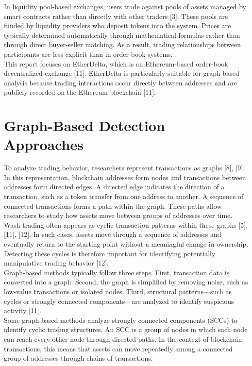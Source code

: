\documentclass[language=english,thesis=bachelor,nosecondtitle,onesided,faculty=cb]{hsmw-thesis}
\begin{document}
In liquidity pool-based exchanges, users trade against pools of assets managed by smart contracts rather than directly with other traders [3]. These pools are funded by liquidity providers who deposit tokens into the system. Prices are typically determined automatically through mathematical formulas rather than through direct buyer-seller matching. As a result, trading relationships between participants are less explicit than in order-book systems.\\
This report focuses on EtherDelta, which is an Ethereum-based order-book decentralized exchange [11]. EtherDelta is particularly suitable for graph-based analysis because trading interactions occur directly between addresses and are publicly recorded on the Ethereum blockchain [11].

	\section{Graph-Based Detection Approaches}
To analyze trading behavior, researchers represent transactions as graphs [8], [9]. In this representation, blockchain addresses form nodes and transactions between addresses form directed edges. A directed edge indicates the direction of a transaction, such as a token transfer from one address to another. A sequence of connected transactions forms a path within the graph. These paths allow researchers to study how assets move between groups of addresses over time.\\
Wash trading often appears as cyclic transaction patterns within these graphs [5], [11], [12]. In such cases, assets move through a sequence of addresses and eventually return to the starting point without a meaningful change in ownership. Detecting these cycles is therefore important for identifying potentially manipulative trading behavior [12].\\
Graph-based methods typically follow three steps. First, transaction data is converted into a graph. Second, the graph is simplified by removing noise, such as low-value transactions or isolated nodes. Third, structural patterns—such as cycles or strongly connected components—are analyzed to identify suspicious activity [11].\\
Some graph-based methods analyze strongly connected components (SCCs) to identify cyclic trading structures. An SCC is a group of nodes in which each node can reach every other node through directed paths. In the context of blockchain transactions, this means that assets can move repeatedly among a connected group of addresses through chains of transactions.\\
\end{document}
